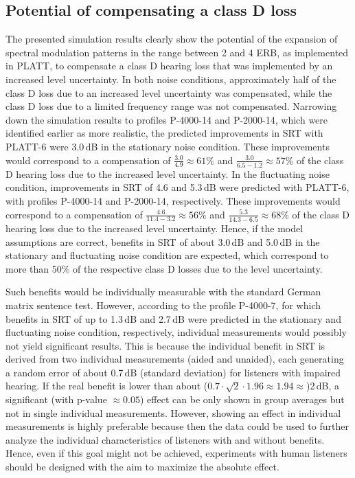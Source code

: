 \documentclass[10pt,a4paper,twocolumn]{article}
\begin{document}
\subsection*{Potential of compensating a class D loss}
%
The presented simulation results clearly show the potential of the expansion of spectral modulation patterns in the range between 2 and 4 ERB, as implemented in PLATT, to compensate a class D hearing loss that was implemented by an increased level uncertainty.
%
In both noise conditions, approximately half of the class D loss due to an increased level uncertainty was compensated, while the class D loss due to a limited frequency range was not compensated.
%
Narrowing down the simulation results to profiles P-4000-14 and P-2000-14, which were identified earlier as more realistic, the predicted improvements in SRT with PLATT-6 were 3.0\,dB in the stationary noise condition.
%
These improvements would correspond to a compensation of $\frac{3.0}{4.9}\approx61\%$ and $\frac{3.0}{6.5-1.2}\approx57\%$ of the class D hearing loss due to the increased level uncertainty.
%
In the fluctuating noise condition, improvements in SRT of 4.6 and 5.3\,dB were predicted with PLATT-6, with profiles P-4000-14 and P-2000-14, respectively.
%
These improvements would correspond to a compensation of $\frac{4.6}{11.4-3.2}\approx56\%$ and $\frac{5.3}{14.3-6.5}\approx68\%$ of the class D hearing loss due to the increased level uncertainty.
%
Hence, if the model assumptions are correct, benefits in SRT of about 3.0\,dB and 5.0\,dB in the stationary and fluctuating noise condition are expected, which correspond to more than 50\% of the respective class D losses due to the level uncertainty.

Such benefits would be individually measurable with the standard German matrix sentence test.
%
However, according to the profile P-4000-7, for which benefits in SRT of up to 1.3\,dB and 2.7\,dB were predicted in the stationary and fluctuating noise condition, respectively, individual measurements would possibly not yield significant results.
%
This is because the individual benefit in SRT is derived from two individual measurements (aided and unaided), each generating a random error of about 0.7\,dB (standard deviation) for listeners with impaired hearing.
%
If the real benefit is lower than about ($0.7\cdot\sqrt{2}\cdot1.96\approx1.94\approx$)2\,dB, a significant (with p-value $\approx0.05$) effect can be only shown in group averages but not in single individual measurements.
%
However, showing an effect in individual measurements is highly preferable because then the data could be used to further analyze the individual characteristics of listeners with and without benefits.
%
Hence, even if this goal might not be achieved, experiments with human listeners should be designed with the aim to maximize the absolute effect.
\end{document}
